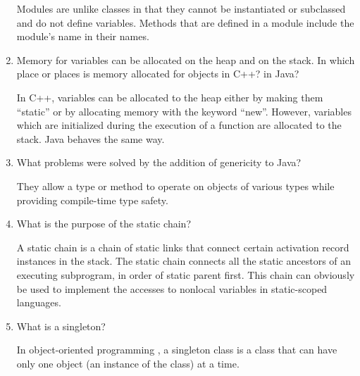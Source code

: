 \begin{enumerate}
  \begin{answer}
Modules are unlike classes in that they cannot be instantiated or subclassed and do not define variables. Methods that are defined in a module include the  module’s name in their names.

    \end{answer}


  \item Memory for variables can be allocated on the heap
    and on the stack. In which place or places is memory
    allocated for objects in C++? in Java?

  \begin{answer}

In C++, variables can be allocated to the heap either by making them “static” or by allocating memory with the keyword “new”. However, variables which are initialized during the execution of a function are allocated to the stack. Java behaves the same way. 

    \end{answer}


  \item What problems were solved by the addition
    of genericity to Java?

  \begin{answer}

    They allow a type or method to operate on objects of various types while providing compile-time type safety.

    \end{answer}


  \item What is the purpose of the static chain?

  \begin{answer}

   A static chain is a chain of static links that connect certain activation record instances in the stack. The static chain connects all the static ancestors of an executing subprogram, in order of static parent first. This chain can obviously be used to implement the accesses to nonlocal variables in static-scoped languages. 

    \end{answer}


  \item What is a singleton?

  \begin{answer}

   In object-oriented programming , a singleton class is a class that can have only one object (an instance of the class) at a time. 


\end{answer}
\end{enumerate}
